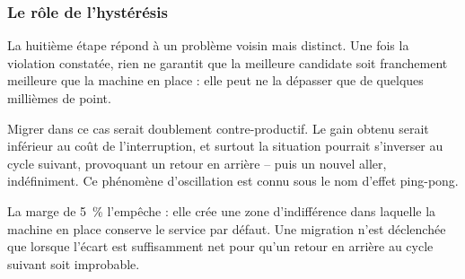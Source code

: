 \subsubsection{Le rôle de l'hystérésis}

La huitième étape répond à un problème voisin mais distinct. Une fois la violation constatée, rien ne garantit que la meilleure candidate soit franchement meilleure que la machine en place : elle peut ne la dépasser que de quelques millièmes de point.

Migrer dans ce cas serait doublement contre-productif. Le gain obtenu serait inférieur au coût de l'interruption, et surtout la situation pourrait s'inverser au cycle suivant, provoquant un retour en arrière -- puis un nouvel aller, indéfiniment. Ce phénomène d'oscillation est connu sous le nom d'effet ping-pong.

La marge de 5~\% l'empêche : elle crée une zone d'indifférence dans laquelle la machine en place conserve le service par défaut. Une migration n'est déclenchée que lorsque l'écart est suffisamment net pour qu'un retour en arrière au cycle suivant soit improbable.